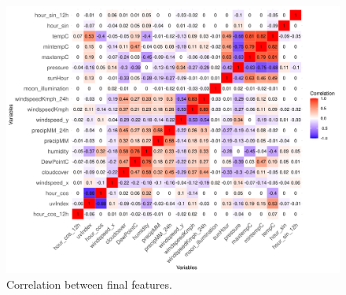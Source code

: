 \documentclass[twoside,11pt]{article}
\begin{document}
\begin{figure}[H]
  \centering
  \includegraphics[width=\textwidth]{assets/feature-correlation-matrix-final.png}
  \caption{Correlation between final features.}
  \label{fig:final_feature_correlation}
\end{figure}

\newpage











\end{document}
